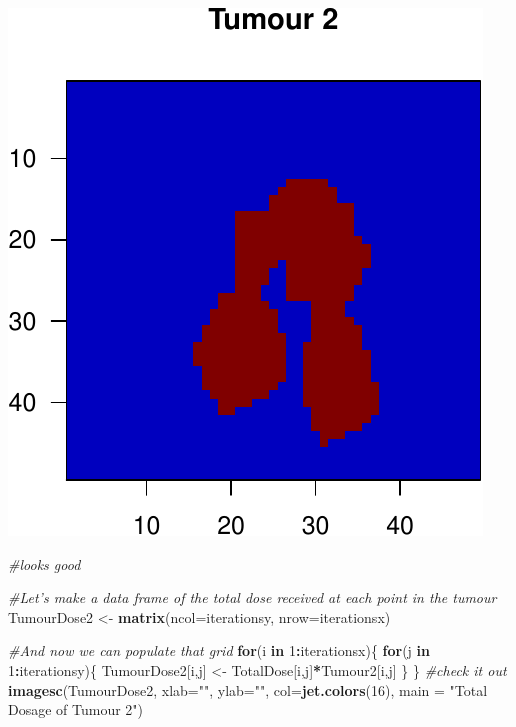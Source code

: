 \documentclass[]{article}
\newenvironment{Shaded}{\begin{snugshade}}{\end{snugshade}}
\newcommand{\KeywordTok}[1]{\textcolor[rgb]{0.13,0.29,0.53}{\textbf{#1}}}
\newcommand{\DataTypeTok}[1]{\textcolor[rgb]{0.13,0.29,0.53}{#1}}
\newcommand{\DecValTok}[1]{\textcolor[rgb]{0.00,0.00,0.81}{#1}}
\newcommand{\StringTok}[1]{\textcolor[rgb]{0.31,0.60,0.02}{#1}}
\newcommand{\CommentTok}[1]{\textcolor[rgb]{0.56,0.35,0.01}{\textit{#1}}}
\newcommand{\ControlFlowTok}[1]{\textcolor[rgb]{0.13,0.29,0.53}{\textbf{#1}}}
\newcommand{\OperatorTok}[1]{\textcolor[rgb]{0.81,0.36,0.00}{\textbf{#1}}}
\newcommand{\NormalTok}[1]{#1}
\begin{document}
\begin{center}\includegraphics{TumourSurvival_files/figure-latex/unnamed-chunk-13-1} \end{center}

\begin{Shaded}
\begin{Highlighting}[]
\CommentTok{#looks good}

\CommentTok{#Let's make a data frame of the total dose received at each point in the tumour}
\NormalTok{TumourDose2 <-}\StringTok{ }\KeywordTok{matrix}\NormalTok{(}\DataTypeTok{ncol=}\NormalTok{iterationsy, }\DataTypeTok{nrow=}\NormalTok{iterationsx)}

\CommentTok{#And now we can populate that grid}
\ControlFlowTok{for}\NormalTok{(i }\ControlFlowTok{in} \DecValTok{1}\OperatorTok{:}\NormalTok{iterationsx)\{}
  \ControlFlowTok{for}\NormalTok{(j }\ControlFlowTok{in} \DecValTok{1}\OperatorTok{:}\NormalTok{iterationsy)\{}
\NormalTok{    TumourDose2[i,j] <-}\StringTok{ }\NormalTok{TotalDose[i,j]}\OperatorTok{*}\NormalTok{Tumour2[i,j]}
\NormalTok{  \}}
\NormalTok{\}}
\CommentTok{#check it out}
\KeywordTok{imagesc}\NormalTok{(TumourDose2, }\DataTypeTok{xlab=}\StringTok{""}\NormalTok{, }\DataTypeTok{ylab=}\StringTok{""}\NormalTok{, }\DataTypeTok{col=}\KeywordTok{jet.colors}\NormalTok{(}\DecValTok{16}\NormalTok{), }\DataTypeTok{main =} \StringTok{"Total Dosage of Tumour 2"}\NormalTok{)}
\end{Highlighting}
\end{Shaded}
\end{document}
